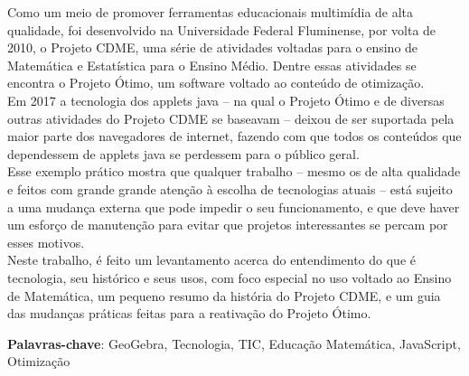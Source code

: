 \documentclass[12pt,openright,twoside,a4paper,brazil]{abntex2}
\begin{document}
\begin{resumo}
    
   Como um meio de promover ferramentas educacionais multimídia de alta qualidade, foi desenvolvido na Universidade Federal Fluminense, por volta de 2010, o Projeto CDME, uma série de atividades voltadas para o ensino de Matemática e Estatística para o Ensino Médio. Dentre essas atividades se encontra o Projeto Ótimo, um software voltado ao conteúdo de otimização.
   \\
    
    Em 2017 a tecnologia dos applets java -- na qual o Projeto Ótimo e de diversas outras atividades do Projeto CDME se baseavam -- deixou de ser suportada pela maior parte dos navegadores de internet, fazendo com que todos os conteúdos que dependessem de applets java se perdessem para o público geral.
    \\

    Esse exemplo prático mostra que qualquer trabalho -- mesmo os de alta qualidade e feitos com grande grande atenção à escolha de tecnologias atuais -- está sujeito a uma mudança externa que pode impedir o seu funcionamento, e que deve haver um esforço de manutenção para evitar que projetos interessantes se percam por esses motivos.
    \\
    
    Neste trabalho, é feito um levantamento acerca do entendimento do que é tecnologia, seu histórico e seus usos, com foco especial no uso voltado ao Ensino de Matemática, um pequeno resumo da história do Projeto CDME, e um guia das mudanças práticas feitas para a reativação do Projeto Ótimo.
    
    \vspace{\onelineskip}
    \noindent
    \textbf{Palavras-chave}: GeoGebra, Tecnologia, TIC, Educação Matemática, JavaScript, Otimização
\end{resumo}
\end{document}
